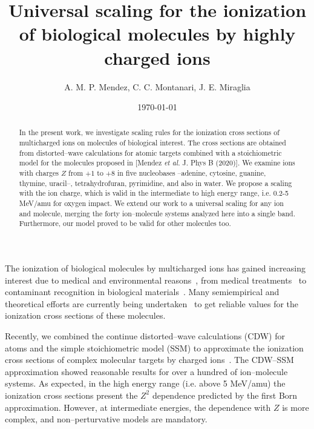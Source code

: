 \documentclass[10pt,showpacs,showkeys,twocolumn]{revtex4}
\begin{document}
\title[Universal scaling for the ionization of biological molecules]{
Universal scaling for the ionization of biological molecules by highly charged ions}
\author{A. M. P. Mendez, C. C. Montanari, J. E. Miraglia}

\date{\today}%

\begin{abstract}
In the present work, we investigate scaling rules for the ionization cross sections of multicharged ions on molecules of biological interest. The cross sections are obtained from distorted--wave calculations for atomic targets combined with a stoichiometric model for the molecules proposed in [Mendez \textit{et al.} J. Phys B (2020)]. We examine ions with charges $Z$ from $+1$ to $+8$ in five nucleobases --adenine, cytosine, guanine, thymine, uracil--, tetrahydrofuran, pyrimidine, and also in water. We propose a scaling with the ion charge, which is valid in the intermediate to high energy range, i.e. 0.2-5 MeV/amu for oxygen impact. We extend our work to a universal scaling for any ion and molecule, merging the forty ion--molecule systems analyzed here into a single band. Furthermore, our model proved to be valid for other molecules too.  
\end{abstract}


\maketitle


The ionization of biological molecules by multicharged ions has gained increasing interest due to medical and environmental reasons~\cite{PhysMed}, from medical treatments~\cite{Mohamad2017,Solov2009,Denifl2011} to contaminant recognition in biological materials~\cite{water,ferrazdias}. Many semiempirical \citep{vera_prl2013} and theoretical efforts are currently being undertaken~\cite{MendezJPB20,Quinto20,ludde2019,ludde2018,ludde2016,Champion2012} to get reliable values for the ionization cross sections of these molecules. 

Recently, we combined the continue distorted--wave calculations (CDW) for atoms and the simple stoichiometric model (SSM) to approximate the ionization cross sections of complex molecular targets by charged ions~\cite{MendezJPB20}. The CDW--SSM approximation showed reasonable results for over a hundred of ion--molecule systems. As expected, in the high energy range (i.e. above 5 MeV/amu) the ionization cross sections  present the $Z^2$ dependence predicted by the first Born approximation. However, at intermediate energies, the dependence with $Z$ is more complex, and non--perturvative models are mandatory.  
\end{document}
